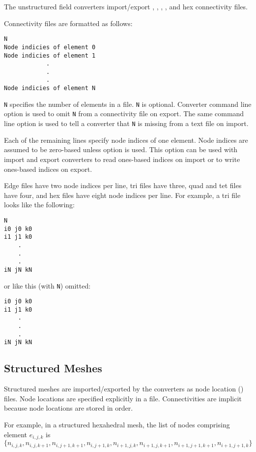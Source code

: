 The unstructured field converters import/export ,
, , , and hex connectivity
files.

Connectivity files are formatted as follows:

\begin{verbatim}
N
Node indicies of element 0
Node indicies of element 1
            .
            .
            .
Node indicies of element N
\end{verbatim}

\verb|N| specifies the number of elements in a file.  \verb|N| is
optional.  Converter command line option  is
used to omit \verb|N| from a connectivity file on export.  The same
command line option is used to tell a converter that \verb|N| is
missing from a text file on import.

Each of the remaining lines specify node indices of one element.
Node indices are assumed to be zero-based unless option
 is used.  This option can be used with
import and export converters to read ones-based indices on
import or to write ones-based indices on export.

Edge files have two node indices per line, tri files have three, quad
and tet files have four, and hex files have eight node indices per
line.  For example, a tri file looks like the following:

\begin{verbatim}
N
i0 j0 k0
i1 j1 k0
    .
    .
    .
iN jN kN
\end{verbatim}

or like this (with \verb|N|) omitted:

\begin{verbatim}
i0 j0 k0
i1 j1 k0
    .
    .
    .
iN jN kN
\end{verbatim}

\subsection{Structured Meshes}

Structured meshes are imported/exported by the converters as node
location () files.  Node locations are specified explicitly in a
 file. Connectivities are implicit because node locations are
stored in  order.

For example, in a structured hexahedral mesh, the list of nodes comprising
element \(e_{i,j,k}\) is \(\{n_{i,j,k}, n_{i,j,k+1}, n_{i,j+1,k+1}, n_{i,j+1,k}, n_{i+1,j,k}, n_{i+1,j,k+1}, n_{i+1,j+1,k+1}, n_{i+1,j+1,k}\}\)

